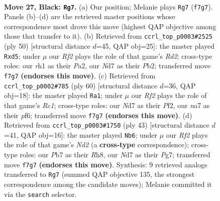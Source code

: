 \documentclass[11pt]{article}
\begin{document}
\clearpage

\begin{figure}[p]\centering
\begin{subfigure}{0.46\textwidth}\centering
\resizebox{\linewidth}{!}{%
\newchessgame
\chessboard[
  setfen={4k3/Nppnpr1p/6p1/p7/5P1P/2P5/P1n1KP2/2B4R b - - 0 27},
  showmover=false,
  pgfstyle=straightmove, color=movearrow, markmove={f7-g7}
]}
\caption{}
\end{subfigure}\hfill
\begin{subfigure}{0.46\textwidth}\centering
\resizebox{\linewidth}{!}{%
\newchessgame
\chessboard[
  setfen={2b4r/ppp1kp2/7p/3pP2P/8/5N2/PPPR2P1/6K1 w - - 0 26},
  showmover=false,
  pgfstyle=straightmove, color=movearrow, markmove={d2-d5}
]}
\caption{}
\end{subfigure}
\\[4pt]
\begin{subfigure}{0.46\textwidth}\centering
\resizebox{\linewidth}{!}{%
\newchessgame
\chessboard[
  setfen={6k1/3r1p2/1b2pp2/1Np4p/P7/1P3P2/5P1P/2R3K1 w - - 0 31},
  showmover=false,
  pgfstyle=straightmove, color=movearrow, markmove={c1-a1}
]}
\caption{}
\end{subfigure}\hfill
\begin{subfigure}{0.46\textwidth}\centering
\resizebox{\linewidth}{!}{%
\newchessgame
\chessboard[
  setfen={2b1k2r/p2n1ppp/4p3/4P3/3PpP2/8/PN1K2PP/5B1R b k - 0 22},
  showmover=false,
  pgfstyle=straightmove, color=movearrow, markmove={d7-b6}
]}
\caption{}
\end{subfigure}
\caption{\textbf{Move 27, Black: \texttt{Rg7}.} (a) Our position; Melanie plays \texttt{Rg7} (\texttt{f7g7}). Panels (b)--(d) are the retrieved master positions whose correspondence most drove this move (highest QAP objective among those that transfer to it). (b) Retrieved from \texttt{ccrl\_top\_p0003\#2525} (ply 50) [structural distance $d$=45, QAP obj=25]: the master played \texttt{Rxd5}; under $\mu$ our \emph{Rf2} plays the role of that game's \emph{Rd2}; cross-type roles: our \emph{r}h1 as their \emph{P}a2, our \emph{N}d7 as their \emph{P}b2; transferred move \texttt{f7g7} \textbf{(endorses this move)}. (c) Retrieved from \texttt{ccrl\_top\_p0002\#785} (ply 60) [structural distance $d$=36, QAP obj=18]: the master played \texttt{Ra1}; under $\mu$ our \emph{Rf2} plays the role of that game's \emph{Rc1}; cross-type roles: our \emph{N}d7 as their \emph{P}f2, our \emph{n}a7 as their \emph{p}f6; transferred move \texttt{f7g7} \textbf{(endorses this move)}. (d) Retrieved from \texttt{ccrl\_top\_p0003\#1750} (ply 43) [structural distance $d$=41, QAP obj=16]: the master played \texttt{Nb6}; under $\mu$ our \emph{Rf2} plays the role of that game's \emph{Nd2} (a \textbf{cross-type} correspondence); cross-type roles: our \emph{P}b7 as their \emph{R}h8, our \emph{N}d7 as their \emph{P}g7; transferred move \texttt{f7g7} \textbf{(endorses this move)}. Synthesis: 9 retrieved analogs transferred to \texttt{Rg7} (summed QAP objective 135, the strongest correspondence among the candidate moves); Melanie committed it via the \texttt{search} selector.}
\label{fig:thought-m53}
\end{figure}
\end{document}
